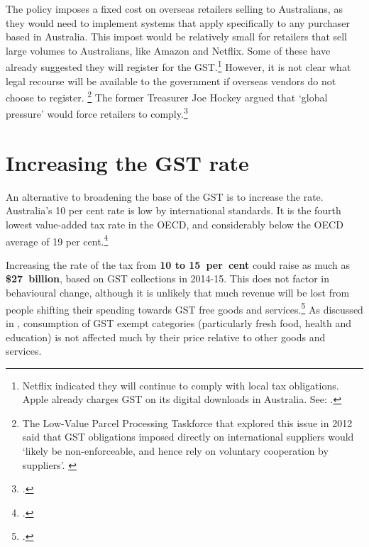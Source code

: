 \documentclass{grattanAlpha}
\begin{document}
The policy imposes a fixed cost on overseas retailers selling to Australians, as they would need to implement systems that apply specifically to any purchaser based in Australia. This impost would be relatively small for retailers that sell large volumes to Australians, like Amazon and Netflix. Some of these have already suggested they will register for the GST.\footnote{Netflix indicated they will continue to comply with local tax obligations. Apple already charges GST on its digital downloads in Australia. See: \textcite{Coorey2015-Netflix}.}  However, it is not clear what legal recourse will be available to the government if overseas vendors do not choose to register.%
\footnote{The Low-Value Parcel Processing Taskforce that explored this issue in 2012 said that GST obligations imposed directly on international suppliers would ‘likely be non-enforceable, and hence rely on voluntary cooperation by suppliers’. \textcite[][139]{Treasury2012c}}  The former Treasurer Joe Hockey argued that ‘global pressure’ would force retailers to comply.\footcite{Hockey2015--GST-import-threshold}  

\section{Increasing the GST rate}\label{sec:GST-2-2}
An alternative to broadening the base of the GST is to increase the rate. Australia’s 10 per cent rate is low by international standards. It is the fourth lowest value-added tax rate in the OECD, and considerably below the OECD average of 19 per cent.\footcite{OECDKoreaInstitutePublicFinance2014-Distributional-Effects-Consumption-Taxes}  

Increasing the rate of the tax from \textbf{10 to 15~per~cent} could raise as much as \textbf{\$27~billion}, based on GST collections in 2014-15. This does not factor in behavioural change, although it is unlikely that much revenue will be lost from people shifting their spending towards GST free goods and services.\footcite{KPMGEconotech2011-GST}  As discussed in , consumption of GST exempt categories (particularly fresh food, health and education) is not affected much by their price relative to other goods and services.
\end{document}
